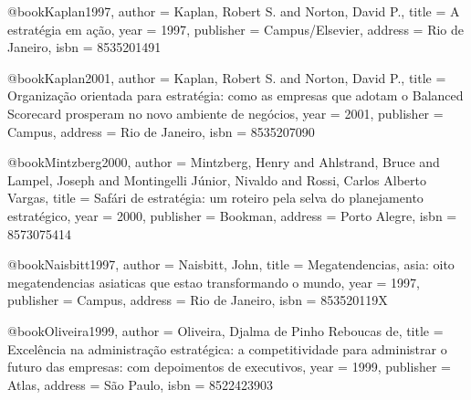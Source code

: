 @book{Kaplan1997,
  author = {Kaplan, Robert S. and Norton, David P.},
  title = {A estratégia em ação},
  year = {1997},
  publisher = {Campus/Elsevier},
  address = {Rio de Janeiro},
  isbn = {8535201491}
}

@book{Kaplan2001,
  author = {Kaplan, Robert S. and Norton, David P.},
  title = {Organização orientada para estratégia: como as empresas que adotam o Balanced Scorecard prosperam no novo ambiente de negócios},
  year = {2001},
  publisher = {Campus},
  address = {Rio de Janeiro},
  isbn = {8535207090}
}

@book{Mintzberg2000,
  author = {Mintzberg, Henry and Ahlstrand, Bruce and Lampel, Joseph and Montingelli Júnior, Nivaldo and Rossi, Carlos Alberto Vargas},
  title = {Safári de estratégia: um roteiro pela selva do planejamento estratégico},
  year = {2000},
  publisher = {Bookman},
  address = {Porto Alegre},
  isbn = {8573075414}
}

@book{Naisbitt1997,
  author = {Naisbitt, John},
  title = {Megatendencias, asia: oito megatendencias asiaticas que estao transformando o mundo},
  year = {1997},
  publisher = {Campus},
  address = {Rio de Janeiro},
  isbn = {853520119X}
}

@book{Oliveira1999,
  author = {Oliveira, Djalma de Pinho Reboucas de},
  title = {Excelência na administração estratégica: a competitividade para administrar o futuro das empresas: com depoimentos de executivos},
  year = {1999},
  publisher = {Atlas},
  address = {São Paulo},
  isbn = {8522423903}
}

